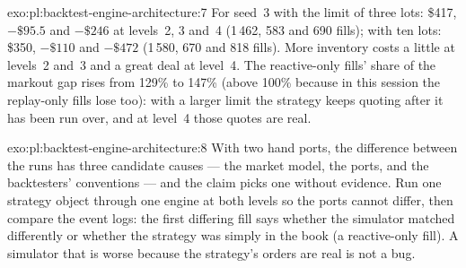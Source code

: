 \begin{solution}{exo:pl:backtest-engine-architecture:7}
For seed~3 with the limit of three lots: \$417, $-\$95.5$ and $-\$246$ at levels~2, 3 and~4 (1\,462, 583 and 690 fills); with ten lots:
\$350, $-\$110$ and $-\$472$ (1\,580, 670 and 818 fills). More inventory costs a little at levels~2 and~3 and a great deal at level~4. The
reactive-only fills' share of the markout gap rises from 129\% to 147\% (above 100\% because in this session the replay-only fills lose
too): with a larger limit the strategy keeps quoting after it has been run over, and at level~4 those quotes are real.
\end{solution}

\begin{solution}{exo:pl:backtest-engine-architecture:8}
With two hand ports, the difference between the runs has three candidate causes --- the market model, the ports, and the backtesters'
conventions --- and the claim picks one without evidence. Run one strategy object through one engine at both levels so the ports cannot
differ, then compare the event logs: the first differing fill says whether the simulator matched differently or whether the strategy was
simply in the book (a reactive-only fill). A simulator that is worse because the strategy's orders are real is not a bug.
\end{solution}


